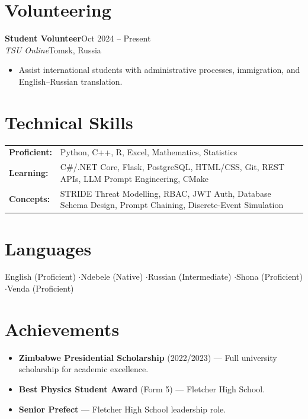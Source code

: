 \documentclass[11pt,a4paper]{article}
\newcommand{\entry}[4]{%
  \textbf{#1}\hfill{\color{MedGray}#2}\\[0.05em]
  {\color{MedGray}\itshape #3}\hfill{\color{MedGray}#4}\par\vspace{0.15em}
}
\begin{document}
\section*{Volunteering}

\entry{Student Volunteer}{Oct 2024 -- Present}
{TSU Online}{Tomsk, Russia}
\begin{itemize}
  \item Assist international students with administrative processes, immigration, and English--Russian translation.
\end{itemize}

\section*{Technical Skills}

\begin{tabularx}{\textwidth}{@{}>{\bfseries}l X@{}}
  Proficient: & Python, C++, R, Excel, Mathematics, Statistics \\[0.3em]
  Learning:   & C\#/.NET Core, Flask, PostgreSQL, HTML/CSS, Git, REST APIs, LLM Prompt Engineering, CMake \\[0.3em]
  Concepts:   & STRIDE Threat Modelling, RBAC, JWT Auth, Database Schema Design, Prompt Chaining, Discrete-Event Simulation \\
\end{tabularx}

\section*{Languages}

English (Proficient) \quad$\cdot$\quad Ndebele (Native) \quad$\cdot$\quad Russian (Intermediate) \quad$\cdot$\quad Shona (Proficient) \quad$\cdot$\quad Venda (Proficient)

\section*{Achievements}

\begin{itemize}[itemsep=3pt]
  \item \textbf{Zimbabwe Presidential Scholarship} (2022/2023) --- Full university scholarship for academic excellence.
  \item \textbf{Best Physics Student Award} (Form 5) --- Fletcher High School.
  \item \textbf{Senior Prefect} --- Fletcher High School leadership role.
\end{itemize}
\end{document}
